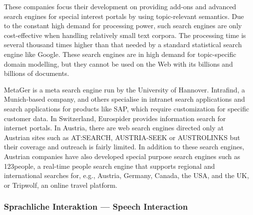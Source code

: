\documentclass[]{../../metanetpaper}
\begin{document}
\begin{Parallel}[c]{80mm}{80mm}
{    These companies focus their development on providing add-ons and advanced search engines for special interest portals by using topic-relevant semantics. Due to the constant high demand for processing power, such search engines are only cost-effective when handling relatively small text corpora. The processing time is several thousand times higher than that needed by a standard statistical search engine like Google. These search engines are in high demand for topic-specific domain modelling, but they cannot be used on the Web with its billions and billions of documents.

    MetaGer is a meta search engine run by the University of Hannover. Intrafind, a Munich-based company, and others specialise in intranet search applications and search applications for products like SAP, which require customization for specific customer data. In Switzerland, Eurospider provides information search for internet portals. In Austria, there are web search engines directed only at Austrian sites such as AT:SEARCH, AUSTRIA-SEEK or AUSTROLINKS but their coverage and outreach is fairly limited. In addition to these search engines, Austrian companies have also developed special purpose search engines such as 123people, a real-time people search engine that supports regional and international searches for, e.g., Austria, Germany, Canada, the USA, and the UK, or Tripwolf, an online travel platform.
  }
  
  \ParallelPar


  \subsubsection{Sprachliche Interaktion --- Speech Interaction}



\end{Parallel}
\end{document}
